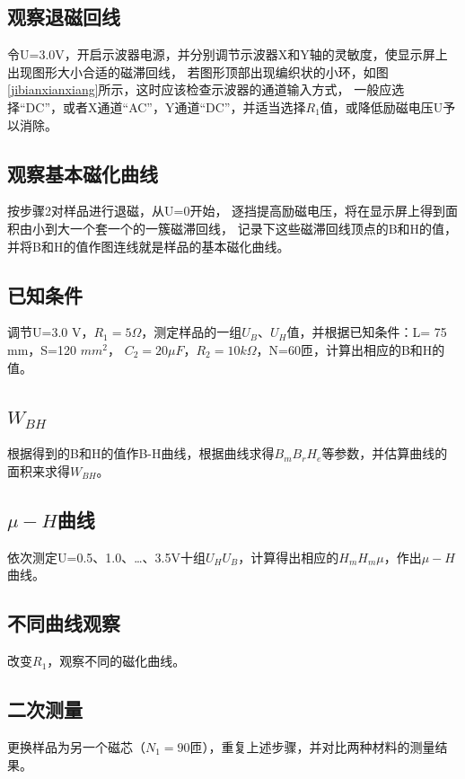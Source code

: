 \documentclass{ctexart}
\begin{document}
  \subsection{观察退磁回线}
  令U=3.0V，开启示波器电源，并分别调节示波器X和Y轴的灵敏度，使显示屏上出现图形大小合适的磁滞回线，
  若图形顶部出现编织状的小环，如图\ref{jibianxianxiang}所示，这时应该检查示波器的通道输入方式，
  一般应选择“DC”，或者X通道“AC”，Y通道“DC”，并适当选择$R_{1}$值，或降低励磁电压U予以消除。

  \subsection{观察基本磁化曲线}
  按步骤2对样品进行退磁，从U=0开始，
  逐挡提高励磁电压，将在显示屏上得到面积由小到大一个套一个的一簇磁滞回线，
  记录下这些磁滞回线顶点的B和H的值，并将B和H的值作图连线就是样品的基本磁化曲线。

  \subsection{已知条件}
  调节U=3.0 V，$R_{1}=5\Omega$，测定样品的一组$U_{B}$、$U_{H}$值，并根据已知条件：L= 75 mm，S=120 $mm^{2}$，
  $C_{2}=20\mu F$，$R_{2}=10k\Omega$，N=60匝，计算出相应的B和H的值。


  \subsection{$W_{BH}$}
  根据得到的B和H的值作B-H曲线，根据曲线求得$B_{m}B_{r}H_{e}$等参数，并估算曲线的面积来求得$W_{BH}$。

  \subsection{$\mu - H$曲线}
  依次测定U=0.5、1.0、\dots、3.5V十组$U_{H}U_{B}$，计算得出相应的$H_{m}H_{m}\mu$，作出$\mu - H$曲线。


  \subsection{不同曲线观察}
  改变$R_{1}$，观察不同的磁化曲线。

  \subsection{二次测量}
  更换样品为另一个磁芯（$N_{1}=90$匝），重复上述步骤，并对比两种材料的测量结果。
\newpage
\end{document}
